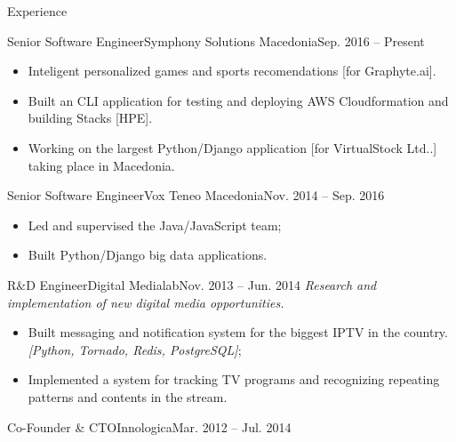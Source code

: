 \documentclass[]{mcdowellcv}
\begin{document}
    \begin{cvsection}{Experience}
    \label{Employment Record}
        \begin{cvsubsection}{Senior Software Engineer}{Symphony Solutions Macedonia}{Sep. 2016 -- Present}
             \begin{itemize}
                 \item Inteligent personalized games and sports recomendations [for Graphyte.ai].
                 \item Built an CLI application for testing and deploying AWS Cloudformation and building Stacks [HPE].
                 \item Working on the largest Python/Django application [for VirtualStock Ltd..] taking place in Macedonia.
             \end{itemize}
        \end{cvsubsection}
        \begin{cvsubsection}{Senior Software Engineer}{Vox Teneo Macedonia}{Nov. 2014 -- Sep. 2016}
            \begin{itemize}
                \item Led and supervised the Java/JavaScript team;
                \item Built Python/Django big data applications.
            \end{itemize}
        \end{cvsubsection}
        \begin{cvsubsection}{R\&D Engineer}{Digital Medialab}{Nov. 2013 -- Jun. 2014}
            \textit{Research and implementation of new digital media opportunities.}
            \begin{itemize}
                \item Built messaging and notification system for the biggest IPTV in the country.
                    \textit{[Python, Tornado, Redis, PostgreSQL]};
                \item Implemented a system for tracking TV programs and recognizing repeating patterns and contents in the stream.
            \end{itemize}
        \end{cvsubsection}
        \begin{cvsubsection}{Co-Founder \& CTO}{Innologica}{Mar. 2012 -- Jul. 2014}

\end{cvsubsection}
\end{cvsection}
\end{document}
